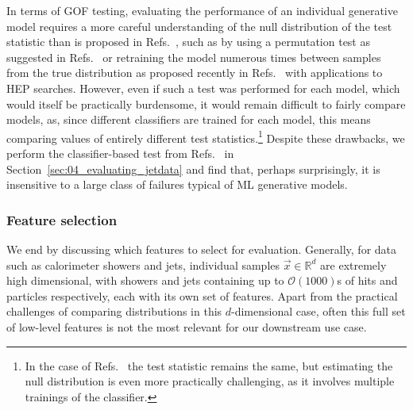 In terms of GOF testing, evaluating the performance of an individual generative model requires a more careful understanding of the null distribution of the test statistic than is proposed in Refs.~\cite{krause_caloflow, calochallenge}, such as by using a permutation test as suggested in Refs.~\cite{friedman_gof, liu_deepkernels} or retraining the model numerous times between samples from the true distribution as proposed recently in Refs.~\cite{dagnolo_nplm, dagnolo_lmnp} with applications to HEP searches.
However, even if such a test was performed for each model, which would itself be practically burdensome, it would remain difficult to fairly compare models, as, since different classifiers are trained for each model, this means comparing values of entirely different test statistics.\footnote{In the case of Refs.~\cite{dagnolo_nplm, dagnolo_lmnp} the test statistic remains the same, but estimating the null distribution is even more practically challenging, as it involves multiple trainings of the classifier.}
Despite these drawbacks, we perform the classifier-based test from Refs.~\cite{krause_caloflow, calochallenge} in Section~\ref{sec:04_evaluating_jetdata} and find that, perhaps surprisingly, it is insensitive to a large class of failures typical of ML generative models.


\subsubsection{Feature selection}
\label{sec:04_evaluating_feature_selection} 

We end by discussing which features to select for evaluation. 
Generally, for data such as calorimeter showers and jets, individual samples $\vec x \in \mathbb R^d$ are extremely high dimensional, with showers and jets containing up to $\mathcal{O}(1000)$s of hits and particles respectively, each with its own set of features. 
Apart from the practical challenges of comparing distributions in this $d$-dimensional case, often this full set of low-level features is not the most relevant for our downstream use case.


